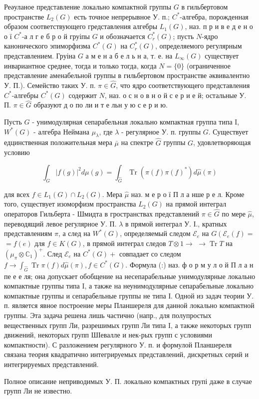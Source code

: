 \documentclass[10pt]{article}
\begin{document}
Реәуланое представление локально компактной группы $G$ в гильбертовом пространстве $L_{2}(G)$ есть точное непрерывное У. п.; $C^{*}$-алгебра, порожденная образом соответствующего гредставления алгебры $L_{1}(G)$, наз. п р и в е д е н о о ї $C^{*}$-а л г е б р о й груіпы $G$ и обозначается $C_{r}^{*}(G)$; пусть $N$-ядро канонического эпиморфизма $C^{*}(G)$ на $C_{r}^{*}(G)$, определяемого регулярным представлением. Груіна $G$ а м е н а б е л ь н а, т. е. на $L_{\infty}(G)$ существует инвариантное среднее, тогда и только тогда, когда $N=\{0\}$ (ограниченное представление аменабельной группы в гильбертовом пространстве әквивалентно У. П.). Семейство таких У. п. $\pi \in \hat{G}$, что ядро соответствующего представления $C^{*}$-алгебры $C^{*}(G)$ содержит $N$, наз. о с н о в н о й с е р и е й; остальные У. П. $\pi \in \widehat{G}$ образуют д о по ли и т е льн у ю с е р и ю.



Пусть $G$ - унимодулярная сепарабельная локально компактная группа типа I, $W^{*}(G)$ - алгебра Неймана $\mu_{\lambda}$, где $\lambda$ - регулярное У. п. группы $G$. Существует едцинственная положительная мера $\bar{\mu}$ на спектре $\hat{G}$ группы $G$, удовлетворяющая условию



\[

\int_{G}|f(g)|^{2} d \mu(g)=\int_{\hat{G}} \operatorname{Tr}\left(\pi(f) \pi(f)^{*}\right) d \hat{\mu}(\pi)

\]



для всех $f \in L_{1}(G) \cap L_{2}(G)$. Мера $\hat{\mu}$ наз. м е р о ї П л а нше р е л. Кроме того, существует изоморфизм пространства $L_{2}(G)$ на прямой интеграл операторов Гильберта - Шмидта в гространствах представлений $\pi \in \widehat{G}$ по мере $\hat{\mu}$, переводящий левое регулярное У. П. $\lambda$ в прямой интеграл У. І., кратных представлениям $\pi$, а след на $W^{*}(G)$, определяемый следом $\mathscr{E}_{e}$ на $G\left(\mathscr{E}_{e}(f)=\right.$ $=f(e)$ для $f \in K(G)$, в прямой интеграл следов $T \otimes 1 \rightarrow$ $\rightarrow \operatorname{Tr} T$ на $\left(\mu_{\pi} \otimes \mathbb{C}_{1}\right)^{+}$. След $\mathscr{E}_{e}$ на $C^{*}(G)+$ совпадает со следом $f \rightarrow \int_{\hat{G}} \operatorname{Tr} \pi(f) d \hat{\mu}(\pi), f \in C^{*}(G)$. Формула (:) наз. ф о р м у л о й П л а н пе е е ля; она допускает обобщение на несепарабельные унимодулярные локально компактные группы типа I, а также на неунимодулярные сепарабельные локально компактные группы и сепарабельные группы не типа І. Одной из задач теории У. п. является явное построение меры Планшереля для данной локально компактной группы. Эта задача решена лишь частично (напр., для полупростых вещественных групп Ли, разрешимых групп Ли типа I, а также некоторых групп движений, некоторых групп ШІевалле и нек-рых групп с условиями компактности). С разложением регулярного У. п. и формулой Планшереля связана теория квадратично интегрируемых представлений, дискретных серий и интегрируемых представлений.



Полное описание неприводимых У. П. локально компактных групі даже в случае групп Ли не известно.
\end{document}
